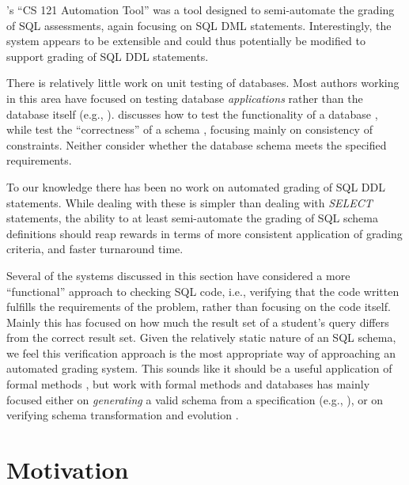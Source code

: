 \documentclass[sigconf, authordraft, capitalise]{acmart}
\begin{document}
\citeauthor{Gong.A-2015a-CS-121-Automation}'s ``CS 121 Automation Tool'' \cite{Gong.A-2015a-CS-121-Automation} was a tool designed to semi-automate the grading of SQL assessments, again focusing on SQL DML statements. Interestingly, the system appears to be extensible and could thus potentially be modified to support grading of SQL DDL statements.

There is relatively little work on unit testing of databases. Most authors working in this area have focused on testing database \emph{applications} rather than the database itself (e.g., \cite{Binnig.C-2008a-Multi-RQP,Chays.D-2008a-Query-based,Marcozzi.M-2012a-Test,Haller.K-2010a-Test}). \citeauthor{Ambler.S-2006a-Database} discusses how to test the functionality of a database \cite{Ambler.S-2006a-Database}, while \citeauthor{Farre.C-2008a-SVTe} test the ``correctness'' of a schema \cite{Farre.C-2008a-SVTe}, focusing mainly on consistency of constraints. Neither consider whether the database schema meets the specified requirements.

To our knowledge there has been no work on automated grading of SQL DDL statements. While dealing with these is simpler than dealing with \emph{SELECT} statements, the ability to at least semi-automate the grading of SQL schema definitions should reap rewards in terms of more consistent application of grading criteria, and faster turnaround time.

Several of the systems discussed in this section \cite{Sadiq.S-2004a-SQLator,Prior.J-2004a-Backwash,Russell.G-2004a-Improving,Dekeyser.S-2007a-Computer,Kleiner.C-2013a-Automated} have considered a more ``functional'' approach to checking SQL code, i.e., verifying that the code written fulfills the requirements of the problem, rather than focusing on the code itself. Mainly this has focused on how much the result set of a student's query differs from the correct result set. Given the relatively static nature of an SQL schema, we feel this verification approach is the most appropriate way of approaching an automated grading system. This sounds like it should be a useful application of formal methods \cite{Spivey.J-1989a-An-introduction}, but work with formal methods and databases has mainly focused either on \emph{generating} a valid schema from a specification (e.g., \cite{Vatanawood.W-2004a-Formal,Lukovic.I-2003a-Proceedings,Choppella.V-2006a-Constructing}), or on verifying schema transformation and evolution \cite{Bench-Capon.T-1998a-Report}.


\section{Motivation}
\label{sec-motivation}
\end{document}
